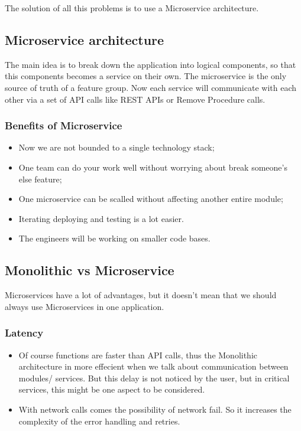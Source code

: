 The solution of all this problems is to use a Microservice architecture. 

\subsection{Microservice architecture}

The main idea is to break down the application into logical components, so that this components
becomes a service on their own. The microservice is the only source of truth of a feature group. 
Now each service will communicate with each other via a set of API calls like REST APIs or 
Remove Procedure calls. 

\subsubsection{Benefits of Microservice}

\begin{itemize}
    \item Now we are not bounded to a single technology stack;
    \item One team can do your work well without worrying about break someone's else feature;
    \item One microservice can be scalled without affecting another entire module;
    \item Iterating deploying and testing is a lot easier. 
    \item The engineers will be working on smaller code bases.  
\end{itemize}


\subsection{Monolithic vs Microservice}

Microservices have a lot of advantages, but it doesn't mean that we should always use Microservices
in one application. 

\subsubsection{Latency}
\begin{itemize}
    \item Of course functions are faster than API calls, thus the 
    Monolithic architecture in more effecient when we talk about communication between modules/
    services. But this delay is not noticed by the user, but in critical services, this might be 
    one aspect to be considered.  
    \item With network calls comes the possibility of network fail. So it increases the 
    complexity of the error handling and retries. 
\end{itemize}

